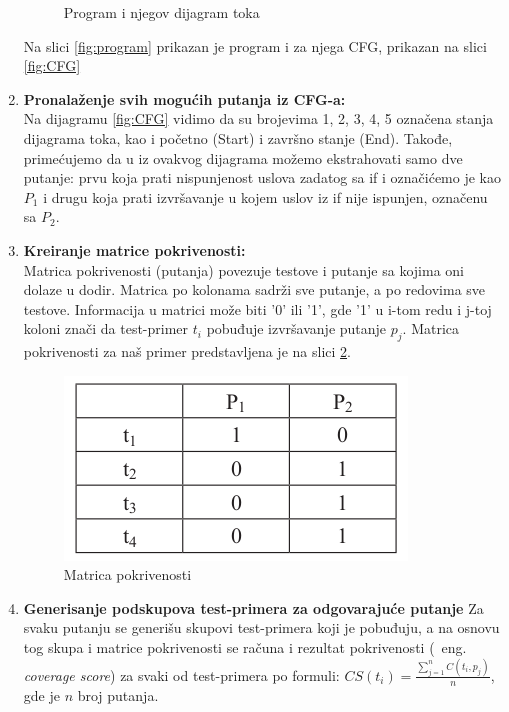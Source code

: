 \documentclass[a4paper]{article}
\begin{document}
\begin{enumerate}
\begin{figure}[h!]
        \caption{Program i njegov dijagram toka}
        \label{fig:prog_CFG}
        \end{figure}
        
        
        Na slici \ref{fig:program} prikazan je program i za njega CFG, prikazan na slici \ref{fig:CFG}
    \item \textbf{Pronalaženje svih mogućih putanja iz CFG-a:}\\
        Na dijagramu \ref{fig:CFG} vidimo da su brojevima 1, 2, 3, 4, 5 označena stanja dijagrama toka, kao i početno (Start) i završno stanje (End). Takođe, primećujemo da u iz ovakvog dijagrama možemo ekstrahovati samo dve putanje: prvu koja prati nispunjenost uslova zadatog sa if i označićemo je kao $P_1$ i drugu koja prati izvršavanje u kojem uslov iz if nije ispunjen, označenu sa $P_2$.
    \item \textbf{Kreiranje matrice pokrivenosti:} \\
        Matrica pokrivenosti (putanja) povezuje testove i putanje sa kojima oni dolaze u dodir. Matrica po kolonama sadrži sve putanje, a po redovima sve testove. Informacija u matrici može biti '0' ili '1', gde '1' u i-tom redu i j-toj koloni znači da test-primer $t_i$ pobuđuje izvršavanje putanje $p_j$. Matrica pokrivenosti za naš primer predstavljena je na slici \ref{fig:pokrivenost}.
        \begin{figure}[h!]
        \begin{center}
        \includegraphics[scale=0.4]{Coverage.png}
        \end{center}
        \caption{Matrica pokrivenosti}
        \label{fig:pokrivenost}
        \end{figure}
    \item \textbf{Generisanje podskupova test-primera za odgovarajuće putanje}
    Za svaku putanju se generišu skupovi test-primera koji je pobuđuju, a na osnovu tog skupa i matrice pokrivenosti se računa i rezultat pokrivenosti (~eng. \textit{coverage score}) za svaki od test-primera po formuli: $CS(t_i) = \frac{\sum_{j=1}^{n}C(t_i, p_j)}{n} $, gde je $n$ broj putanja.

\end{enumerate}
\end{document}
